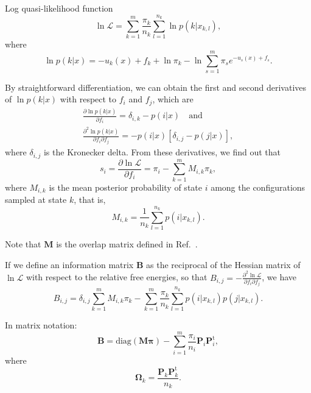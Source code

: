 \documentclass[aip,jcp,preprint,amsmath,amssymb]{revtex4-1}
\newcommand{\mt}[1]{\boldsymbol{\mathbf{#1}}}           %
\newcommand{\vt}[1]{\boldsymbol{\mathbf{#1}}}           %
\newcommand{\tr}[1]{#1^\text{t}}                        %
\begin{document}
Log quasi-likelihood function\cite{Geyer_1992, Geyer_1994}
\begin{equation}
\label{eq:gmbar log quasi-likelihood}
\ln \mathcal L = \sum_{k=1}^m \frac{\pi_k}{n_k} \sum_{l=1}^{n_k} \ln p(k|x_{k,l}),
\end{equation}
where
\begin{equation*}
\ln p(k|x) = -u_k(x) + f_k + \ln \pi_k - \ln \sum_{s=1}^m \pi_s e^{-u_s(x) + f_s}.
\end{equation*}

By straightforward differentiation, we can obtain the first and second derivatives of $\ln p(k|x)$ with respect to $f_i$ and $f_j$, which are
\begin{gather*}
\frac{\partial \ln p(k|x)}{\partial f_i} = \delta_{i,k} - p(i|x) \quad \text{and} \\
\frac{\partial^2\ln p(k|x)}{\partial f_i \partial f_j} = -p(i|x)[\delta_{i,j} - p(j|x)],
\end{gather*}
where $\delta_{i,j}$ is the Kronecker delta. From these derivatives, we find out that
\begin{equation*}
s_i = \frac{\partial \ln \mathcal L}{\partial f_i} = \pi_i - \sum_{k=1}^m M_{i,k} \pi_k,
\end{equation*}
where $M_{i,k}$ is the mean posterior probability of state $i$ among the configurations sampled at state $k$, that is,
\begin{equation*}
M_{i,k} = \frac{1}{n_k} \sum_{l=1}^{n_k} p(i|x_{k,l}).
\end{equation*}

Note that $\mt M$ is the overlap matrix defined in Ref.~.

If we define an information matrix $\mt B$ as the reciprocal of the Hessian matrix of $\ln \mathcal L$ with respect to the relative free energies, so that $B_{i,j} = -\frac{\partial^2 \ln \mathcal L}{\partial f_i \partial f_j}$, we have
\begin{equation*}
B_{i,j} = \delta_{i,j} \sum_{k=1}^m M_{i,k} \pi_k - \sum_{k=1}^m \frac{\pi_k}{n_k} \sum_{l=1}^{n_k} p(i|x_{k,l})p(j|x_{k,l}).
\end{equation*}

In matrix notation:
\begin{equation*}
\mt B = \text{diag}(\mt M \vt \pi) - \sum_{i=1}^m \frac{\pi_i}{n_i} \mt P_i \tr{\mt P}_i,
\end{equation*}
where
\begin{equation*}
\mt \Omega_k = \frac{\mt P_k \tr{\mt P}_k}{n_k}.
\end{equation*}
\end{document}

